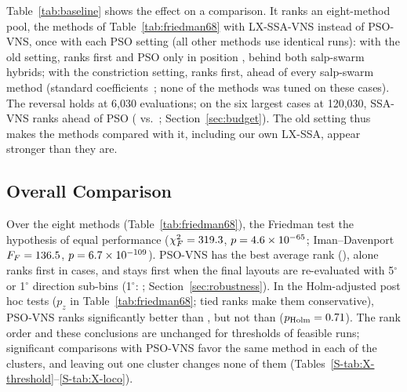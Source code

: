Table~\ref{tab:baseline} shows the effect on a comparison. It ranks an eight-method pool, the methods of Table~\ref{tab:friedman68} with LX-SSA-VNS instead of PSO-VNS, once with each PSO setting (all other methods use identical runs): with the old setting, \NBaseOldBest{} ranks first and PSO only in position \NBaseOldPSOPos{}, behind both salp-swarm hybrids; with the constriction setting, \NBaseNewBest{} ranks first, ahead of every salp-swarm method (standard coefficients~\cite{Clerc2002}; none of the methods was tuned on these cases). The reversal holds at 6,030 evaluations; on the six largest cases at 120,030, SSA-VNS ranks ahead of PSO (\NBudRankSSAVNSOneTwentyK{} vs.\ \NBudRankPSOOneTwentyK; Section~\ref{sec:budget}). The old setting thus makes the methods compared with it, including our own LX-SSA, appear stronger than they are.

\subsection{Overall Comparison}
\label{sec:overall}



Over the eight methods (Table~\ref{tab:friedman68}), the Friedman test \NFriedVerb{} the hypothesis of equal performance ($\chi^2_F=319.3$, $p=4.6\times10^{-65}$; Iman--Davenport $F_F=136.5$, $p=6.7\times10^{-109}$). PSO-VNS has the best average rank (\NRankPSOVNS), alone ranks first in \NSoleBestPSOVNS{} cases, and stays first when the final layouts are re-evaluated with 5$^\circ$ or 1$^\circ$ direction sub-bins (1$^\circ$: \NFRankPSOVNSOne; Section~\ref{sec:robustness}). In the Holm-adjusted post hoc tests ($p_z$ in Table~\ref{tab:friedman68}; tied ranks make them conservative), PSO-VNS ranks significantly better than \NPostHocSigList{}, but not than \NPostHocNonSigList{} ($p_{\rm Holm}=0.71$). The rank order and these conclusions are unchanged for thresholds of \NXThrList{} feasible runs; significant comparisons with PSO-VNS favor the same method in each of the \NXClusters{} clusters, and leaving out one cluster changes none of them (Tables~\ref{S-tab:X-threshold}--\ref{S-tab:X-loco}).

